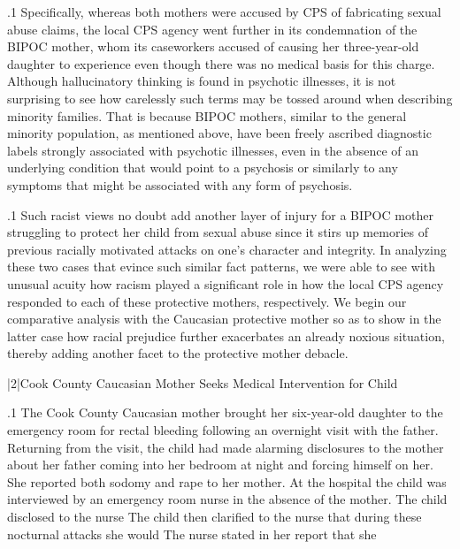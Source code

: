 \documentclass[11pt, twoside]{article}
\begin{document}
{\p.1{%
Specifically, whereas both mothers were accused by CPS of fabricating
sexual abuse claims, the local CPS agency went further in its condemnation of the BIPOC mother, whom its caseworkers accused of causing her
three-year-old daughter to experience \mdash{}even though
there was no medical basis for this charge. Although hallucinatory
thinking is found in psychotic illnesses, it is not surprising to see how
carelessly such terms may be tossed around when describing minority
families. That is because BIPOC mothers, similar to the general minority
population, as mentioned above, have been freely ascribed
diagnostic labels strongly associated with psychotic illnesses, even in the
absence of an underlying condition that would point to a psychosis or
similarly to any symptoms that might be associated with any form of
psychosis.
}%

\p.1{%
Such racist views no doubt add another layer of injury for a BIPOC
mother struggling to protect her child from sexual abuse since
it stirs up memories of previous racially motivated attacks on one's
character and integrity. In analyzing these two cases that evince such
similar fact patterns, we were able to see with unusual acuity how racism
played a significant role in how the local CPS agency responded to each
of these protective mothers, respectively. We begin our comparative
analysis with the Caucasian protective mother so as to show in the
latter case how racial prejudice further exacerbates an already noxious situation, thereby adding another facet to the protective mother
debacle.
}%


\s|2|{Cook County Caucasian Mother Seeks Medical Intervention for Child}

\p.1{%
\noindent{}The Cook County Caucasian mother brought her six-year-old daughter
to the emergency room for rectal bleeding following an overnight visit
with the father. Returning from the visit, the child had made alarming
disclosures to the mother about her father coming into her bedroom at
night and forcing himself on her. She reported both sodomy and rape to
her mother. At the hospital the child was interviewed by an emergency
room nurse in the absence of the mother. The child disclosed to the
nurse  The child then clarified
to the nurse that during these nocturnal attacks she would  The nurse stated in her report that she 
}%

}
\end{document}
